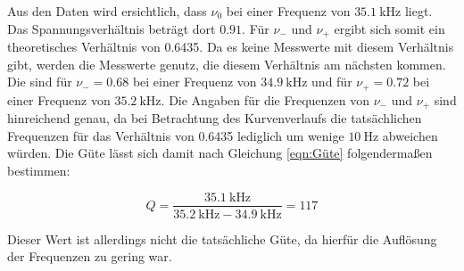 Aus den Daten wird ersichtlich, dass $\nu_0$ bei einer Frequenz von $\SI{35.1}{\kilo\hertz}$ liegt.
Das Spannungsverhältnis beträgt dort $0.91$.
Für $\nu_-$ und $\nu_+$ ergibt sich somit ein theoretisches Verhältnis von 0.6435.
Da es keine Messwerte mit diesem Verhältnis gibt, werden die Messwerte genutz, die diesem Verhältnis am nächsten kommen.
Die sind für $\nu_- = 0.68$ bei einer Frequenz von $\SI{34.9}{\kilo\hertz}$ und für $\nu_+ = 0.72$ bei einer Frequenz von $\SI{35.2}{\kilo\hertz}$.
Die Angaben für die Frequenzen von $\nu_-$ und $\nu_+$ sind hinreichend genau, da bei Betrachtung des Kurvenverlaufs die tatsächlichen Frequenzen für das Verhältnis von 0.6435 lediglich um wenige $\SI{10}{\hertz}$ abweichen würden.
Die Güte lässt sich damit nach Gleichung \eqref{eqn:Güte} folgendermaßen bestimmen:

\begin{equation*}
  Q = \frac{\SI{35.1}{\kilo\hertz}}{\SI{35.2}{\kilo\hertz} - \SI{34.9}{\kilo\hertz}} = 117
\end{equation*}

Dieser Wert ist allerdings nicht die tatsächliche Güte, da hierfür die Auflösung der Frequenzen zu gering war.

